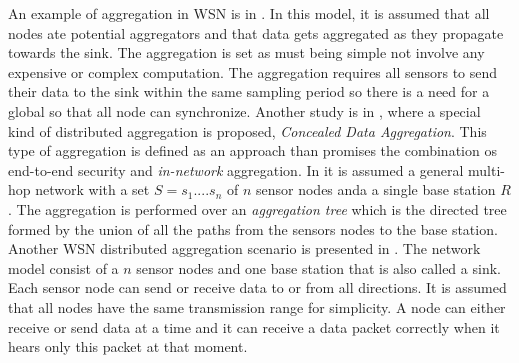 An example of  aggregation in WSN is in  \cite{castelluccia2005efficient}. In this model, it is assumed that all nodes ate potential aggregators and that data gets aggregated as they propagate towards the sink. The aggregation is set as must being simple not involve any expensive or complex computation. The aggregation requires all sensors to send their data to the sink within the same sampling period so there is a need for a global so that all node can synchronize. Another study is in \cite{Girao2004c}, where a special kind of distributed aggregation is proposed, \textit{Concealed Data Aggregation}. This type of aggregation is defined as an approach than promises the combination os end-to-end security and \textit{in-network} aggregation. In \cite{chan2006secure} it is assumed a general multi-hop network with a set $S={s_1....s_n}$ of $n$ sensor nodes anda a single base station $R$. The aggregation is performed over an \textit{aggregation tree} which is the directed tree formed by the union of all the paths from the sensors nodes to the base station. Another WSN distributed aggregation scenario is presented in \cite{yu2009distributed}. The network model consist of a $n$ sensor nodes and one base station that is also called a sink. Each sensor node can send or receive data to or from all directions. It is assumed that all nodes have the same transmission range for simplicity. A node can either receive or send data at a time and it can receive a data packet correctly when it hears only this packet at that moment.


